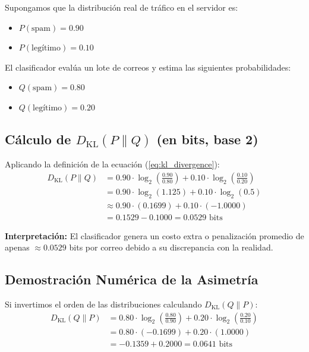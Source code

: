 \documentclass[conference]{IEEEtran}
\begin{document}
	\noindent Supongamos que la distribución real de tráfico en el servidor es:
	\begin{itemize}
		\item $P(\text{spam}) = 0.90$
		\item $P(\text{legítimo}) = 0.10$
	\end{itemize}
	
	\noindent El clasificador evalúa un lote de correos y estima las siguientes probabilidades:
	\begin{itemize}
		\item $Q(\text{spam}) = 0.80$
		\item $Q(\text{legítimo}) = 0.20$
	\end{itemize}
	
	\subsection{Cálculo de $D_{\text{KL}}(P \parallel Q)$ (en bits, base 2)}
	Aplicando la definición de la ecuación (\ref{eq:kl_divergence}):
	\begin{align}
		D_{\text{KL}}(P \parallel Q) &= 0.90 \cdot \log_2\left(\frac{0.90}{0.80}\right) + 0.10 \cdot \log_2\left(\frac{0.10}{0.20}\right) \nonumber \\
		&= 0.90 \cdot \log_2(1.125) + 0.10 \cdot \log_2(0.5) \nonumber \\
		&\approx 0.90 \cdot (0.1699) + 0.10 \cdot (-1.0000) \nonumber \\
		&= 0.1529 - 0.1000 = 0.0529 \text{ bits}
	\end{align}
	
	\noindent \textbf{Interpretación:} El clasificador genera un costo extra o penalización promedio de apenas $\approx 0.0529$ bits por correo debido a su discrepancia con la realidad.
	
	\subsection{Demostración Numérica de la Asimetría}
	Si invertimos el orden de las distribuciones calculando $D_{\text{KL}}(Q \parallel P)$:
	\begin{align}
		D_{\text{KL}}(Q \parallel P) &= 0.80 \cdot \log_2\left(\frac{0.80}{0.90}\right) + 0.20 \cdot \log_2\left(\frac{0.20}{0.10}\right) \nonumber \\
		&= 0.80 \cdot (-0.1699) + 0.20 \cdot (1.0000) \nonumber \\
		&= -0.1359 + 0.2000 = 0.0641 \text{ bits}
	\end{align}
	
\end{document}
